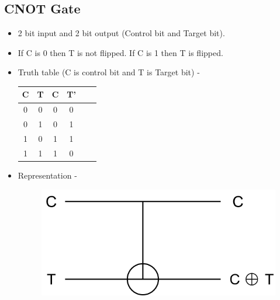 \documentclass[11.5pt, paper=a4]{article}
\theoremstyle{definition}
\numberwithin{theorem}{section}
\begin{document}
\subsection{CNOT Gate}
    \begin{itemize}
        \item 2 bit input and 2 bit output (Control bit and Target bit).
        \item If C is 0 then T is not flipped. If C is 1 then T is flipped.
        \item Truth table (C is control bit and T is Target bit) - 
            \begin{center}
            \begin{tabular}{ |c|c|c|c|c|c| } 
            \hline
            C & T & C & T'\\ 
            \hline
            0 & 0 & 0 & 0\\
            0 & 1 & 0 & 1\\
            1 & 0 & 1 & 1\\
            1 & 1 & 1 & 0\\
            \hline
            \end{tabular}
            \end{center}
        \item Representation -
        \begin{figure}[h]
            \centering
            \includegraphics[scale=0.3]{CNOTgate.png}
        \end{figure}
    \end{itemize}
\end{document}
